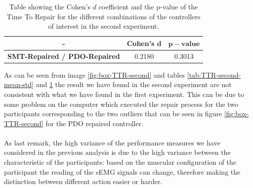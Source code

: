 \begin{table}[H]
    \centering
    \begin{tabular}{|c|c|c|}
        \hline
        - & \textbf{Cohen's} $\mathbf{d}$ & $\mathbf{p-value}$ \\
        \hline
        \textbf{SMT-Repaired / PDO-Repaired} & 0.2180 & 0.3013 \\
        \hline
    \end{tabular}
    \caption{Table showing the Cohen's $d$ coefficient and the p-value of the Time To Repair for the different combinations of the controllers of interest in the second experiment.}
    \label{tab:TTR-second-cohen-p}
\end{table}
As can be seen from image \ref{fig:box-TTR-second} and tables \ref{tab:TTR-second-mean-std} and \ref{tab:TTR-second-cohen-p} the result we have found in the second experiment are not consistent with what we have found in the first experiment. This can be due to some problem on the computer which executed the repair process for the two participants corresponding to the two outliers that can be seen in figure \ref{fig:box-TTR-second} for the PDO repaired controller.\\\\
As last remark, the high variance of the performance measures we have considered in the previous analysis is due to the high variance between the characteristic of the participants: based on the muscular configuration of the participant the reading of the sEMG signals can change, therefore making the distinction between different action easier or harder.